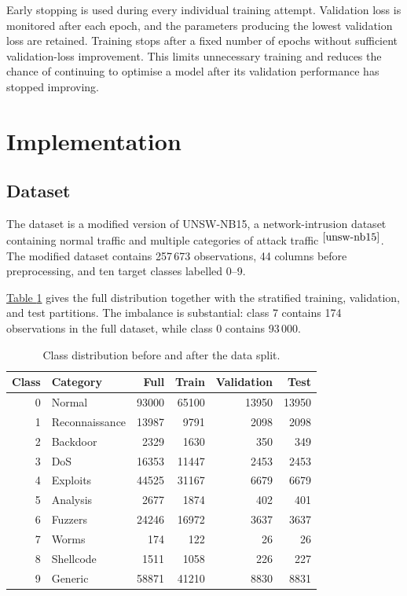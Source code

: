 \documentclass[conference]{IEEEtran}
\begin{document}
Early stopping is used during every individual training attempt. Validation loss is monitored after each epoch, and the parameters producing the lowest validation loss are retained. Training stops after a fixed number of epochs without sufficient validation-loss improvement. This limits unnecessary training and reduces the chance of continuing to optimise a model after its validation performance has stopped improving.

\section{Implementation} %

% 
% 
% 


\subsection{Dataset}

The dataset is a modified version of UNSW-NB15, a network-intrusion dataset containing normal traffic and multiple categories of attack traffic $^{\cite{unsw-nb15}}$. The modified dataset contains 257\,673 observations, 44 columns before preprocessing, and ten target classes labelled 0--9.

\hyperref[tab:class_distribution]{Table \ref*{tab:class_distribution}} gives the full distribution together with the stratified training, validation, and test partitions. The imbalance is substantial: class 7 contains 174 observations in the full dataset, while class 0 contains 93\,000.

\begin{table}[H]
    \centering
    \caption{Class distribution before and after the data split.}
    \label{tab:class_distribution}
    \scriptsize
    \begin{tabular}{rlrrrr}
        \toprule
        Class & Category & Full & Train & Validation & Test \\
        \midrule
        0 & Normal & 93000 & 65100 & 13950 & 13950 \\
        1 & Reconnaissance & 13987 & 9791 & 2098 & 2098 \\
        2 & Backdoor & 2329 & 1630 & 350 & 349 \\
        3 & DoS & 16353 & 11447 & 2453 & 2453 \\
        4 & Exploits & 44525 & 31167 & 6679 & 6679 \\
        5 & Analysis & 2677 & 1874 & 402 & 401 \\
        6 & Fuzzers & 24246 & 16972 & 3637 & 3637 \\
        7 & Worms & 174 & 122 & 26 & 26 \\
        8 & Shellcode & 1511 & 1058 & 226 & 227 \\
        9 & Generic & 58871 & 41210 & 8830 & 8831 \\
        \bottomrule
    \end{tabular}
\end{table}
\end{document}

